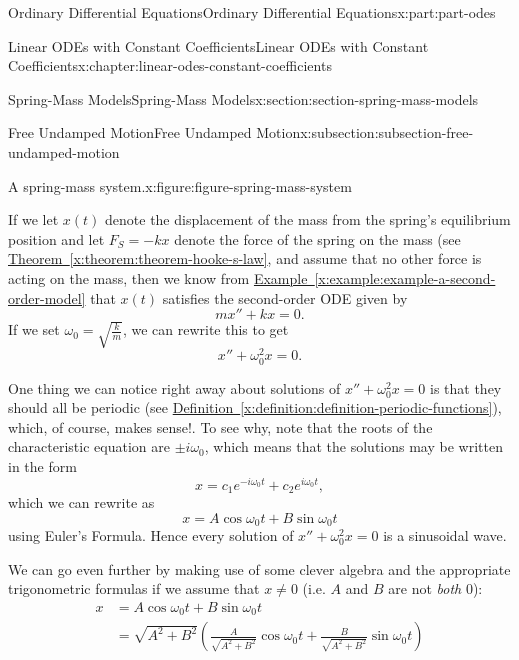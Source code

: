 \documentclass[twoside,10pt,]{book}
\newcommand{\xreffont}{\relax}
\numberwithin{equation}{part}
\newcommand{\amp}{&}
\begin{document}
\begin{partptx}{Ordinary Differential Equations}{}{Ordinary Differential Equations}{}{}{x:part:part-odes}
\begin{chapterptx}{Linear ODEs with Constant Coefficients}{}{Linear ODEs with Constant Coefficients}{}{}{x:chapter:linear-odes-constant-coefficients}
\begin{sectionptx}{Spring-Mass Models}{}{Spring-Mass Models}{}{}{x:section:section-spring-mass-models}
\begin{subsectionptx}{Free Undamped Motion}{}{Free Undamped Motion}{}{}{x:subsection:subsection-free-undamped-motion}
\begin{figureptx}{A spring-mass system.}{x:figure:figure-spring-mass-system}{}
\begin{image}{0}{1}{0}
{
}%
\end{image}%
\tcblower
\end{figureptx}%
If we let \(x(t)\) denote the displacement of the mass from the spring's equilibrium position and let \(F_{S} = -kx\) denote the force of the spring on the mass (see \hyperref[x:theorem:theorem-hooke-s-law]{Theorem~{\xreffont\ref{x:theorem:theorem-hooke-s-law}}}, and assume that no other force is acting on the mass, then we know from \hyperref[x:example:example-a-second-order-model]{Example~{\xreffont\ref{x:example:example-a-second-order-model}}} that \(x(t)\) satisfies the second-order ODE given by%
\begin{equation*}
mx'' + kx = 0.
\end{equation*}
If we set \(\omega_{0} = \sqrt{\frac{k}{m}}\), we can rewrite this to get%
\begin{equation*}
x'' + \omega_{0}^{2}x = 0.
\end{equation*}
%
\par
One thing we can notice right away about solutions of \(x''+\omega_{0}^{2}x = 0\) is that they should all be periodic (see \hyperref[x:definition:definition-periodic-functions]{Definition~{\xreffont\ref{x:definition:definition-periodic-functions}}}), which, of course, makes sense!. To see why, note that the roots of the characteristic equation are \(\pm i\omega_{0}\), which means that the solutions may be written in the form%
\begin{equation*}
x = c_{1}e^{-i\omega_{0}t} + c_{2}e^{i\omega_{0}t},
\end{equation*}
which we can rewrite as%
\begin{equation*}
x = A\cos\omega_{0}t + B\sin\omega_{0}t
\end{equation*}
using Euler's Formula. Hence every solution of \(x''+\omega_{0}^{2}x = 0\) is a sinusoidal wave.%
\par
We can go even further by making use of some clever algebra and the appropriate trigonometric formulas if we assume that \(x\neq0\) (i.e. \(A\) and \(B\) are not \emph{both} \(0\)):%
\begin{align*}
x \amp = A\cos\omega_{0}t + B\sin\omega_{0}t \\
\amp = \sqrt{A^{2}+B^{2}}\left(\frac{A}{\sqrt{A^{2}+B^{2}}}\cos\omega_{0}t + \frac{B}{\sqrt{A^{2} + B^{2}}}\sin\omega_{0}t\right) 

\end{align*}
\end{subsectionptx}
\end{sectionptx}
\end{chapterptx}
\end{partptx}
\end{document}
